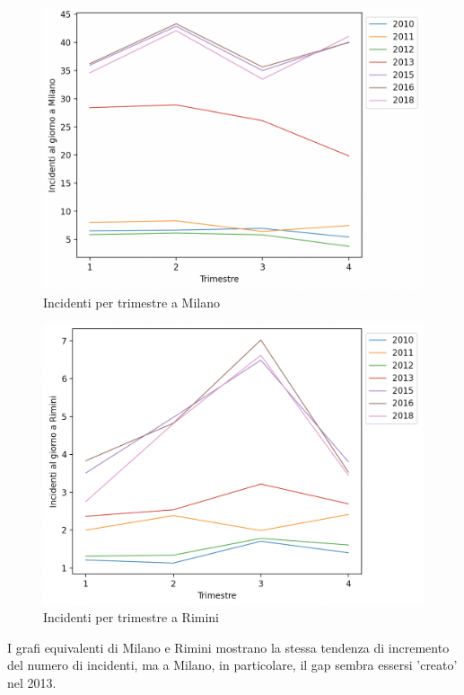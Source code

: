 \documentclass[a4paper]{report}
\begin{document}
\begin{figure}
    \includegraphics[width=\linewidth]{../src/incidenti/incidenti_senza_coords/mese_incidenti/milano_trimestre.png}
    \caption{Incidenti per trimestre a Milano}
    \label{fig:milano_trimestre}
\end{figure}

\begin{figure}
    \includegraphics[width=\linewidth]{../src/incidenti/incidenti_senza_coords/mese_incidenti/rimini_trimestre.png}
    \caption{Incidenti per trimestre a Rimini}
    \label{fig:rimini_trimestre}
\end{figure}

I grafi equivalenti di Milano e Rimini mostrano la stessa tendenza di incremento del numero 
di incidenti, ma a Milano, in particolare, il gap sembra essersi 'creato' nel 2013.
\end{document}
